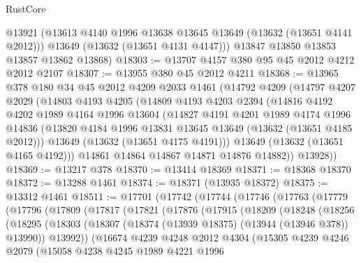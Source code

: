 \begin{lexlean}{RustCore}
\begin{coremodule}
        @13921
        (@13613 @4140 @1996 @13638 @13645 @13649 (@13632 (@13651 @4141 @2012)))
        @13649
        (@13632 (@13651 @4131 @4147)))
      @13847
      @13850
      @13853
      @13857
      @13862
      @13868)
@18303 := @13707 @4157 @380 @95 @45 @2012 @4212 @2012 @2107
@18307 := @13955 @380 @45 @2012 @4211
@18368 := @13965
    @378
    @180
    @34
    @45
    @2012
    @4209
    @2033
    @1461
    (@14792
      @4209
      (@14797
        @4207
        @2029
        (@14803
          @4193
          @4205
          (@14809
            @4193
            @4203
            @2394
            (@14816
              @4192
              @4202
              @1989
              @4164
              @1996
              @13604
              (@14827
                @4191
                @4201
                @1989
                @4174
                @1996
                @14836
                (@13820 @4184 @1996 @13831 @13645 @13649 (@13632 (@13651 @4185 @2012)))
                @13649
                (@13632 (@13651 @4175 @4191)))
              @13649
              (@13632 (@13651 @4165 @4192)))
            @14861
            @14864
            @14867
            @14871
            @14876
            @14882))
        @13928))
@18369 := @13217 @378
@18370 := @13414 @18369
@18371 := @18368 @18370
@18372 := @13288 @1461
@18374 := @18371 (@13935 @18372)
@18375 := @13312 @1461
@18511 := @17701
    (@17742
      (@17744
        (@17746
          (@17763
            (@17779
              (@17796
                (@17809
                  (@17817
                    (@17821
                      (@17876
                        (@17915
                          (@18209
                            (@18248
                              (@18256
                                (@18295
                                  (@18303
                                    (@18307 (@18374 (@13939 @18375) (@13944 (@13946 @378)) @13990))
                                    @13992))
                                (@16674
                                  @4239
                                  @4248
                                  @2012
                                  @4304
                                  (@15305
                                    @4239
                                    @4246
                                    @2079
                                    (@15058
                                      @4238
                                      @4245
                                      @1989
                                      @4221
                                      @1996

\end{coremodule}
\end{lexlean}
